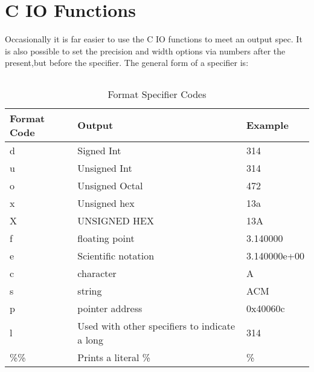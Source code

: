\section{C IO Functions}
Occasionally it is far easier to use the C IO functions to meet an output spec. It is also possible to set the precision and width options via numbers after the present,but before the specifier.  The general form of a specifier is: 

\begin{lstlisting}[label=set code,caption=Some Code]
    %[flags][width][.precision][length]specifier
\end{lstlisting}

\begin{table}[h]
    \caption{Format Specifier Codes \cite{cplusplus}}
    \begin{tabularx}{\textwidth}{|l|X|l|} \hline
        Format Code &   Output              &   Example     \\ \hline
        d           &   Signed Int          &   314         \\
        u           &   Unsigned Int        &   314         \\
        o           &   Unsigned Octal      &   472         \\
        x           &   Unsigned hex        &   13a         \\
        X           &   UNSIGNED HEX        &   13A         \\
        f           &   floating point      &   3.140000    \\
        e           &   Scientific notation &   3.140000e+00\\
        c           &   character           &   A           \\
        s           &   string              &   ACM         \\
        p           &   pointer address     &   0x40060c    \\
        l           &   Used with other specifiers to indicate a long & 314 \\
        \%\%        &   Prints a literal \% &   \%          \\
        \hline
    \end{tabularx}
\end{table}

